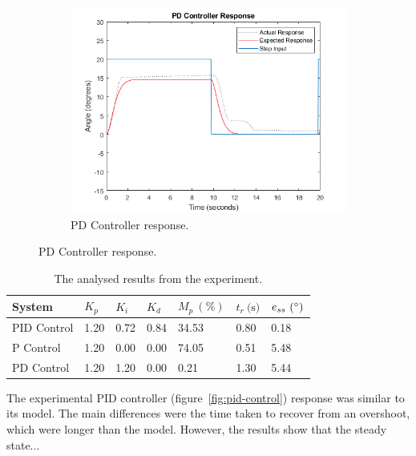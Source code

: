 \documentclass[12pt]{article} %
\begin{document}
\begin{figure}[H]
\begin{subfigure}[b]{0.4\textwidth}
		\includegraphics[width=\textwidth]{pd-control}
		\caption{PD Controller response.}
		\label{fig:pd-control}
	\end{subfigure}
\end{figure}

\begin{table}[H]
\centering
\begin{tabular}{|l|l|l|l|l|l|l|}
	\hline
	\textbf{System} & $K_p$ & $K_i$ & $K_d$ & $M_p\ (\%)$ & $t_r\ \textrm{(s)}$ & $e_{ss}\ \textrm{(\degree)}$ \\
	
	\hline
	PID Control & 1.20 & 0.72 & 0.84 & 34.53 & 0.80 & 0.18 \\
	
	\hline
	P Control & 1.20 & 0.00 & 0.00 & 74.05 & 0.51 & 5.48 \\
	
	\hline
	PD Control & 1.20 & 1.20 & 0.00 & 0.21 & 1.30 & 5.44 \\
	
	\hline
\end{tabular}
\caption{The analysed results from the experiment.}
\label{tab:results}
\end{table}




\noindent The experimental PID controller (figure\ \ref{fig:pid-control}) response was similar to its model. The main differences were the time taken to recover from an overshoot, which were longer than the model. However, the results show that the steady state...
\\
\end{document}
